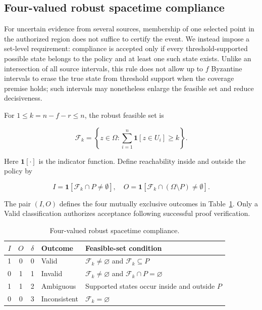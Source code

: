 \subsection{Four-valued robust spacetime compliance}
For uncertain evidence from several sources, membership of one selected point in the authorized region does not suffice to certify the event. We instead impose a set-level requirement: compliance is accepted only if every threshold-supported possible state belongs to the policy and at least one such state exists. Unlike an intersection of all source intervals, this rule does not allow up to $f$ Byzantine intervals to erase the true state from threshold support when the coverage premise holds; such intervals may nonetheless enlarge the feasible set and reduce decisiveness.

For $1 \le k = n - f - r \le n$, the robust feasible set is

\begin{equation}\label{eq:feasible}
\mathcal{F}_k = \left\{ z \in \Omega : \sum_{i=1}^{n} \mathbf{1}[z \in U_i] \ge k \right\}.
\end{equation}


Here $\mathbf{1}[\cdot]$ is the indicator function. Define reachability inside and outside the policy by

\[I = \mathbf{1}[\mathcal{F}_k \cap P \neq \emptyset], \quad O = \mathbf{1}[\mathcal{F}_k \cap (\Omega \setminus P) \neq \emptyset].\]


The pair $(I, O)$ defines the four mutually exclusive outcomes in Table~\ref{tab:decisions}. Only a Valid classification authorizes acceptance following successful proof verification.



\begin{table}[htbp]\centering\small
\caption{Four-valued robust spacetime compliance.}\label{tab:decisions}
\begin{tabularx}{\linewidth}{@{}ccclX@{}}\toprule
$I$ & $O$ & $\delta$ & Outcome & Feasible-set condition\\\midrule
1&0&0&Valid&$\mathcal F_k\ne\varnothing$ and $\mathcal F_k\subseteq P$\\
0&1&1&Invalid&$\mathcal F_k\ne\varnothing$ and $\mathcal F_k\cap P=\varnothing$\\
1&1&2&Ambiguous&Supported states occur inside and outside $P$\\
0&0&3&Inconsistent&$\mathcal F_k=\varnothing$\\\bottomrule
\end{tabularx}
\end{table}

